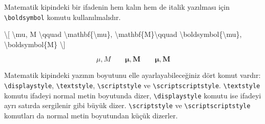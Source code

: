 \documentclass[
  10pt,
]{scrbook}
\newenvironment{Shaded}{\begin{snugshade}}{\end{snugshade}}
\newcommand{\FunctionTok}[1]{\textcolor[rgb]{0.00,0.00,0.00}{#1}}
\newcommand{\SpecialCharTok}[1]{\textcolor[rgb]{0.00,0.00,0.00}{#1}}
\newcommand{\SpecialStringTok}[1]{\textcolor[rgb]{0.31,0.60,0.02}{#1}}
\theoremstyle{definition}
\theoremstyle{definition}
\theoremstyle{definition}
\theoremstyle{definition}
\theoremstyle{remark}
\begin{document}
Matematik kipindeki bir ifadenin hem kalın hem de italik yazılması için \texttt{\textbackslash{}boldsymbol} komutu kullanılmalıdır.

\begin{Shaded}
\begin{Highlighting}[]
\SpecialStringTok{\textbackslash{}[}
\SpecialCharTok{\textbackslash{}mu}\SpecialStringTok{, M }\SpecialCharTok{\textbackslash{}qquad}\SpecialStringTok{ }\SpecialCharTok{\textbackslash{}mathbf}\SpecialStringTok{\{}\SpecialCharTok{\textbackslash{}mu}\SpecialStringTok{\}, }\SpecialCharTok{\textbackslash{}mathbf}\SpecialStringTok{\{M\}}\SpecialCharTok{\textbackslash{}qquad}
\SpecialCharTok{\textbackslash{}boldsymbol}\SpecialStringTok{\{}\SpecialCharTok{\textbackslash{}mu}\SpecialStringTok{\}, }\SpecialCharTok{\textbackslash{}boldsymbol}\SpecialStringTok{\{M\}}
\SpecialStringTok{\textbackslash{}]}
\end{Highlighting}
\end{Shaded}

\[
\mu, M \qquad \mathbf{\mu}, \mathbf{M}\qquad
\boldsymbol{\mu}, \boldsymbol{M}
\]

Matematik kipindeki yazının boyutunu elle ayarlayabileceğiniz dört komut vardır: \texttt{\textbackslash{}displaystyle}, \texttt{\textbackslash{}textstyle}, \texttt{\textbackslash{}scriptstyle} ve \texttt{\textbackslash{}scriptscriptstyle}. \texttt{\textbackslash{}textstyle} komutu ifadeyi normal metin boyutunda dizer, \texttt{\textbackslash{}displaystyle} komutu ise ifadeyi ayrı satırda sergilenir gibi büyük dizer. \texttt{\textbackslash{}scriptstyle} ve \texttt{\textbackslash{}scriptscriptstyle} komutları da normal metin boyutundan küçük dizerler.

\begin{Shaded}
\end{Shaded}
\end{document}
